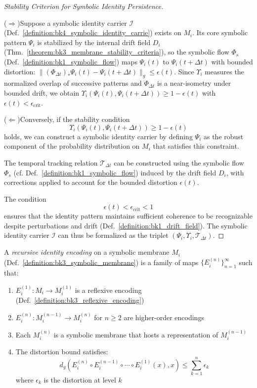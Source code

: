 \begin{proof}[Stability Criterion for Symbolic Identity Persistence]
\label{proof:bk4_symbolic_identity_persistence}
\leavevmode

($\Rightarrow$)\enspace Suppose a symbolic identity carrier $\mathcal{I}$ (Def.~\ref{definition:bk4_symbolic_identity_carrie}) exists on $M_i$. Its core symbolic pattern $\Psi_i$ is stabilized by the internal drift field $D_i$ (Thm.~\ref{theorem:bk3_membrane_stability_criteria}), so the symbolic flow $\Phi_s$ (Def.~\ref{definition:bk1_symbolic_flow}) maps $\Psi_i(t)$ to $\Psi_i(t+\Delta t)$ with bounded distortion: $\|(\Phi_{\Delta t})_*\Psi_i(t) - \Psi_i(t+\Delta t)\|_g \leq \epsilon(t)$. Since $\Upsilon_i$ measures the normalized overlap of successive patterns and $\Phi_{\Delta t}$ is a near-isometry under bounded drift, we obtain $\Upsilon_i(\Psi_i(t), \Psi_i(t+\Delta t)) \geq 1 - \epsilon(t)$ with $\epsilon(t) < \epsilon_{\text{crit}}$.

\medskip

($\Leftarrow$)\enspace Conversely, if the stability condition
\[
\Upsilon_i(\Psi_i(t), \Psi_i(t+\Delta t)) \geq 1 - \epsilon(t)
\]
holds, we can construct a symbolic identity carrier by defining $\Psi_i$ as the robust component of the probability distribution on $M_i$ that satisfies this constraint.

The temporal tracking relation $\mathcal{T}_{\Delta t}$ can be constructed using the symbolic flow $\Phi_s$ (cf. Def.~\ref{definition:bk1_symbolic_flow}) induced by the drift field $D_i$, with corrections applied to account for the bounded distortion $\epsilon(t)$.

\medskip

The condition
\[
\epsilon(t) < \epsilon_{\text{crit}} < 1
\]
ensures that the identity pattern maintains sufficient coherence to be recognizable despite perturbations and drift (Def.~\ref{definition:bk1_drift_field}). The symbolic identity carrier $\mathcal{I}$ can thus be formalized as the triplet $(\Psi_i, \Upsilon_i, \mathcal{T}_{\Delta t})$.
\end{proof}
\begin{definition}
\label{definition:bk4_recursive_identity_encod}
A \emph{recursive identity encoding} on a symbolic membrane $M_i$ (Def.~\ref{definition:bk3_symbolic_membrane}) is a family of maps $\{E_i^{(n)}\}_{n=1}^{\infty}$ such that:
\begin{enumerate}
    \item $E_i^{(1)}: M_i \to M_i^{(1)}$ is a reflexive encoding (Def.~\ref{definition:bk3_reflexive_encoding})
    \item $E_i^{(n)}: M_i^{(n-1)} \to M_i^{(n)}$ for $n \geq 2$ are higher-order encodings
    \item Each $M_i^{(n)}$ is a symbolic membrane that hosts a representation of $M_i^{(n-1)}$
    \item The distortion bound satisfies:
    \[
    d_g\left(E_i^{(n)} \circ E_i^{(n-1)} \circ \cdots \circ E_i^{(1)}(x), x\right) \leq \sum_{k=1}^{n} \epsilon_k
    \]
    where $\epsilon_k$ is the distortion at level $k$
\end{enumerate}
\end{definition}

